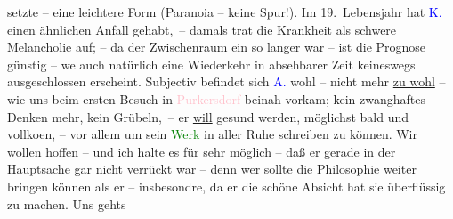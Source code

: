                setzte – eine leichtere Form \introOben{}(Paranoia – keine Spur!)\introOben{}. Im
               19. Lebensjahr hat \textcolor{blue}{K.}{}\ledrightnote{\textcolor{blue}{Arthur Kaufmann}} einen ähnlichen Anfall
               gehabt, – damals trat die Krankheit als schwere Melancholie auf; – da der
               Zwischenraum ein so langer war – ist die Prognose günstig – we{\geminationn}{ }\introOben{}auch\introOben{} natürlich eine Wiederkehr in absehbarer Zeit keineswegs
               ausgeschlossen erscheint. Subjectiv befindet sich \textcolor{blue}{A.}{}\ledrightnote{\textcolor{blue}{Arthur Kaufmann}} wohl – nicht mehr \uline{zu wohl} – wie uns beim
               ersten Besuch \introOben{}in \textcolor{pink}{Purkersdorf}{}\ledrightnote{\textcolor{pink}{Purkersdorf}}\introOben{} beinah vorkam; kein zwanghaftes Denken mehr, kein Grübeln, – er \uline{will} gesund werden, möglichst bald und vollko{\geminationm}en, – vor allem um sein \textcolor{green}{Werk}{} in aller Ruhe schreiben zu können. Wir wollen hoffen –
               und ich halte es für sehr möglich – daß er gerade in der Hauptsache gar nicht
               verrückt war – denn wer sollte die Philosophie weiter bringen können als er –
               insbesondre, da er die schöne Absicht hat sie überflüssig zu machen. Uns gehts
                  \label{TLL02265_Beer-Hofmann-1v}\label{TLL02265_Beer-Hofmann-1h}{ }\label{TLL02265_Beer-Hofmann-2v}\label{TLL02265_Beer-Hofmann-2h}\pend
           \endnumbering{}  
      